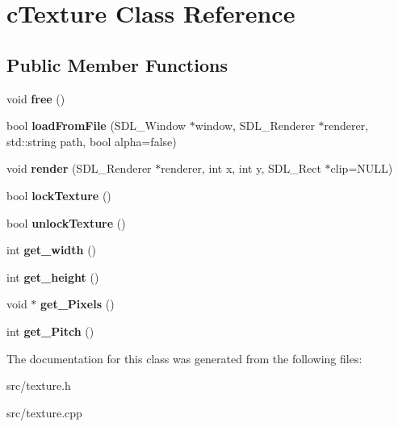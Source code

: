 \hypertarget{classc_texture}{}\section{c\+Texture Class Reference}
\label{classc_texture}
\subsection*{Public Member Functions}
\begin{DoxyCompactItemize}
\item 
\mbox{\label{classc_texture_ae1b8b5e9937e12e78d0690a4d65d009d}} 
void {\bfseries free} ()
\item 
\mbox{\label{classc_texture_a8c6693ed080b092e3df01088458c56c3}} 
bool {\bfseries load\+From\+File} (S\+D\+L\+\_\+\+Window $\ast$window, S\+D\+L\+\_\+\+Renderer $\ast$renderer, std\+::string path, bool alpha=false)
\item 
\mbox{\label{classc_texture_a5d44eca36bed76a2f6b5957dcaf36aa9}} 
void {\bfseries render} (S\+D\+L\+\_\+\+Renderer $\ast$renderer, int x, int y, S\+D\+L\+\_\+\+Rect $\ast$clip=N\+U\+LL)
\item 
\mbox{\label{classc_texture_a44a4383549b33717afd8332d4af1273d}} 
bool {\bfseries lock\+Texture} ()
\item 
\mbox{\label{classc_texture_ac5b0611fcd4e8b654d149f196bb6bcc8}} 
bool {\bfseries unlock\+Texture} ()
\item 
\mbox{\label{classc_texture_a22d9f1ac30579c850cefc75b4a3bf45e}} 
int {\bfseries get\+\_\+width} ()
\item 
\mbox{\label{classc_texture_a47cfaa037316662747f9023c8cb10d06}} 
int {\bfseries get\+\_\+height} ()
\item 
\mbox{\label{classc_texture_a05965a9d3e9377e73e736f15741600d0}} 
void $\ast$ {\bfseries get\+\_\+\+Pixels} ()
\item 
\mbox{\label{classc_texture_aada117fba4b2180aa74db39b1f92fb36}} 
int {\bfseries get\+\_\+\+Pitch} ()
\end{DoxyCompactItemize}


The documentation for this class was generated from the following files\+:\begin{DoxyCompactItemize}
\item 
src/texture.\+h\item 
src/texture.\+cpp\end{DoxyCompactItemize}
